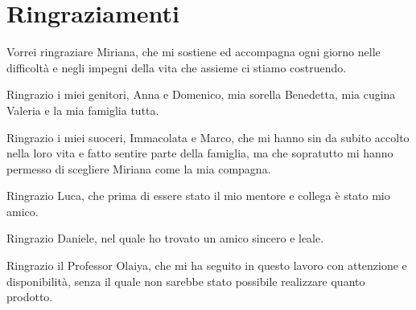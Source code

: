\rhead[\fancyplain{}{\bfseries \leftmark}]{\fancyplain{}{\bfseries
    \thepage}}

    \clearpage{\pagestyle{empty}\cleardoublepage}
\chapter*{Ringraziamenti}
\thispagestyle{empty}


Vorrei ringraziare Miriana, che mi sostiene ed accompagna ogni giorno nelle difficoltà e negli impegni della vita
che assieme ci stiamo costruendo.

Ringrazio i miei genitori, Anna e Domenico, mia sorella Benedetta, mia cugina Valeria e la mia famiglia tutta.

Ringrazio i miei suoceri, Immacolata e Marco, che mi hanno sin da subito accolto nella loro vita e fatto sentire parte
della famiglia, ma che sopratutto mi hanno permesso di scegliere Miriana come la mia compagna.

Ringrazio Luca, che prima di essere stato il mio mentore e collega è stato mio amico.

Ringrazio Daniele, nel quale ho trovato un amico sincero e leale.

Ringrazio il Professor Olaiya, che mi ha seguito in questo lavoro con attenzione e disponibilità, senza il quale
non sarebbe stato possibile realizzare quanto prodotto.